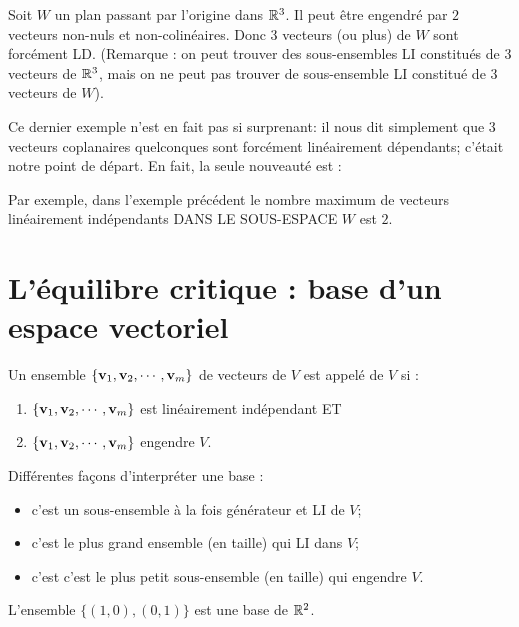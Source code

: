 \begin{myexample} Soit $W$ un plan passant par l'origine dans $\mathbb{R}^3$.
Il peut être engendré par $2$ vecteurs non-nuls et non-colinéaires. Donc
3 vecteurs (ou plus) de $W$ sont forcément LD.   
(Remarque : on peut trouver des sous-ensembles LI constitués de $3$ vecteurs de $\mathbb{R}^3$, mais on ne peut pas trouver de sous-ensemble LI constitué de $3$ vecteurs de $W$). \end{myexample}

Ce dernier exemple n'est en fait pas si surprenant: il nous dit simplement que 3 vecteurs coplanaires quelconques sont forcément linéairement dépendants; c'était notre point de départ. En fait, la seule nouveaut\'e est :


Par exemple, dans l'exemple précédent le nombre maximum de vecteurs linéairement indépendants DANS LE SOUS-ESPACE $W$ est $2$.

\section{L'équilibre critique : base d'un espace vectoriel}



\begin{definition}
Un ensemble $\{\mathbf{v}_1,\mathbf{v}_2, \cdots, \mathbf{v}_m\}$ de vecteurs de $V$ est
appelé  de $V$ si :
\begin{enumerate}
\item $\{\mathbf{v}_1,\mathbf{v}_2, \cdots, \mathbf{v}_m\}$ est linéairement indépendant ET
\item $\{\mathbf{v}_1,\mathbf{v}_2, \cdots, \mathbf{v}_m\}$ engendre $V$.
\end{enumerate}
\end{definition}

Différentes façons d'interpr\'eter une base :
\begin{itemize}
\item c'est un sous-ensemble à la fois g\'en\'erateur et LI de $V$;
\item c'est le plus grand ensemble (en taille) qui LI dans $V$;
\item c'est c'est le plus petit sous-ensemble (en taille) qui engendre $V$.
\end{itemize}
 
\begin{myexample} L'ensemble $\{(1,0), (0,1)\}$ est une base de $\mathbb{R}^2$. \end{myexample}

